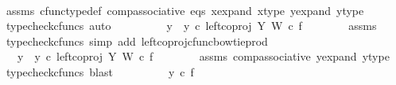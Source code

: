 \begin{isabellebody}
\ \ \ \ \ \ \isamarkupfalse%
\ assms\ cfunc{\isacharunderscore}{\kern0pt}type{\isacharunderscore}{\kern0pt}def\ comp{\isacharunderscore}{\kern0pt}associative\ eqs\ x{\isacharunderscore}{\kern0pt}expand\ x{\isacharunderscore}{\kern0pt}type\ y{\isacharunderscore}{\kern0pt}expand\ y{\isacharunderscore}{\kern0pt}type\ \isamarkupfalse%
\ {\isacharparenleft}{\kern0pt}typecheck{\isacharunderscore}{\kern0pt}cfuncs{\isacharcomma}{\kern0pt}\ auto{\isacharparenright}{\kern0pt}\isanewline
\ \ \ \ \isamarkupfalse%
\ \isamarkupfalse%
\ {\isachardoublequoteopen}{\isachardot}{\kern0pt}{\isachardot}{\kern0pt}{\isachardot}{\kern0pt}\ {\isacharequal}{\kern0pt}\ {\isacharparenleft}{\kern0pt}y{}\ {\isasymamalg}\ y{}{\isacharparenright}{\kern0pt}\ {\isasymcirc}\isactrlsub c\ left{\isacharunderscore}{\kern0pt}coproj\ Y\ W\ {\isasymcirc}\isactrlsub c\ f{\isachardoublequoteclose}\isanewline
\ \ \ \ \ \ \isamarkupfalse%
\ assms\ \isamarkupfalse%
\ {\isacharparenleft}{\kern0pt}typecheck{\isacharunderscore}{\kern0pt}cfuncs{\isacharcomma}{\kern0pt}\ simp\ add{\isacharcolon}{\kern0pt}\ left{\isacharunderscore}{\kern0pt}coproj{\isacharunderscore}{\kern0pt}cfunc{\isacharunderscore}{\kern0pt}bowtie{\isacharunderscore}{\kern0pt}prod{\isacharparenright}{\kern0pt}\isanewline
\ \ \ \ \isamarkupfalse%
\ \isamarkupfalse%
\ {\isachardoublequoteopen}{\isachardot}{\kern0pt}{\isachardot}{\kern0pt}{\isachardot}{\kern0pt}\ {\isacharequal}{\kern0pt}\ {\isacharparenleft}{\kern0pt}{\isacharparenleft}{\kern0pt}y{}\ {\isasymamalg}\ y{}{\isacharparenright}{\kern0pt}\ {\isasymcirc}\isactrlsub c\ left{\isacharunderscore}{\kern0pt}coproj\ Y\ W{\isacharparenright}{\kern0pt}\ {\isasymcirc}\isactrlsub c\ f{\isachardoublequoteclose}\isanewline
\ \ \ \ \ \ \isamarkupfalse%
\ assms\ comp{\isacharunderscore}{\kern0pt}associative{}\ y{\isacharunderscore}{\kern0pt}expand\ y{\isacharunderscore}{\kern0pt}type\ \isamarkupfalse%
\ {\isacharparenleft}{\kern0pt}typecheck{\isacharunderscore}{\kern0pt}cfuncs{\isacharcomma}{\kern0pt}\ blast{\isacharparenright}{\kern0pt}\isanewline
\ \ \ \ \isamarkupfalse%
\ \isamarkupfalse%
\ {\isachardoublequoteopen}{\isachardot}{\kern0pt}{\isachardot}{\kern0pt}{\isachardot}{\kern0pt}\ {\isacharequal}{\kern0pt}\ y{}\ {\isasymcirc}\isactrlsub c\ f{\isachardoublequoteclose}\isanewline
\ \ \ \ \ \ \isamarkupfalse%

\end{isabellebody}
